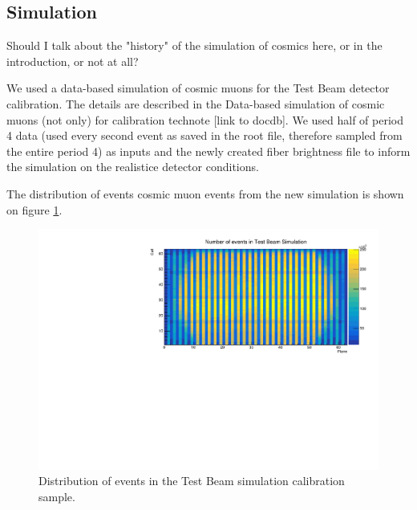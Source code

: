 \documentclass[12pt,a4paper]{article}
\begin{document}
\subsection{Simulation}

Should I talk about the "history" of the simulation of cosmics here, or in the introduction, or not at all?


We used a data-based simulation of cosmic muons for the Test Beam detector calibration. The details are described in the Data-based simulation of cosmic muons (not only) for calibration technote [link to docdb]. We used half of period 4 data (used every second event as saved in the root file, therefore sampled from the entire period 4) as inputs and the newly created fiber brightness file to inform the simulation on the realistice detector conditions.

The distribution of events cosmic muon events from the new simulation is shown on figure \ref{figCalibhistSim}.

\begin{figure}[h]
\centering
\includegraphics[width=\textwidth]{Plots/Attenprofs_Simulation_CellPlane.pdf}
\caption{Distribution of events in the Test Beam simulation calibration sample.}
\label{figCalibhistSim}
\end{figure}
\end{document}
